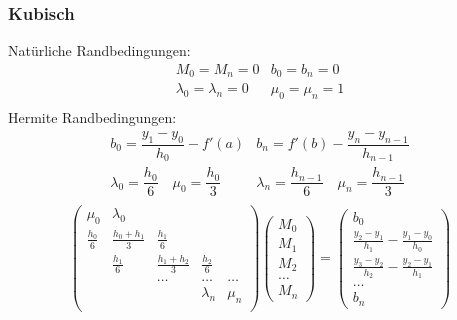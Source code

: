 \documentclass[
ngerman,
accentcolor=9c,%
type=intern,
marginpar=false
]{tudapub}
\begin{document}
            \subsubsection{Kubisch}
            Natürliche Randbedingungen:\\
            \begin{equation*}
                \begin{matrix}
                    M_0 = M_n = 0 & b_0 = b_n = 0\\
                    \lambda_0 = \lambda_n = 0 & \mu_0 = \mu_n = 1\\
                \end{matrix}
            \end{equation*}
            Hermite Randbedingungen:\\
            \begin{equation*}
                \begin{matrix}
                    b_0 = \dfrac{y_1-y_0}{h_0} - f'(a) & b_n = f'(b) - \dfrac{y_n - y_{n-1}}{h_{n-1}} \\
                    \lambda_0 =\dfrac{h_0}{6}  \quad \mu_0 = \dfrac{h_0}{3} & \lambda_n = \dfrac{h_{n-1}}{6} \quad \mu_n = \dfrac{h_{n-1}}{3}\\
                \end{matrix}
            \end{equation*}
            \begin{equation*}
                \begin{pmatrix}
                    \mu_0 & \lambda_0 \\
                    \frac{h_0}{6} & \frac{h_0 + h_1}{3} & \frac{h_1}{6}\\
                    & \frac{h_1}{6} & \frac{h_1 + h_2}{3} & \frac{h_2}{6}\\
                    & & \dots & \dots & \dots \\
                    & &  & \lambda_n & \mu_n\\
                \end{pmatrix}
                \begin{pmatrix}
                    M_0\\
                    M_1\\
                    M_2\\
                    \dots\\
                    M_n
                \end{pmatrix}
                =\begin{pmatrix}
                     b_0\\
                     \frac{y_2 - y_1}{h_1} - \frac{y_1-y_0}{h_0}\\
                     \frac{y_3 - y_2}{h_2} - \frac{y_2-y_1}{h_1}\\
                     \dots\\
                     b_n
                \end{pmatrix}
            \end{equation*}
\end{document}
